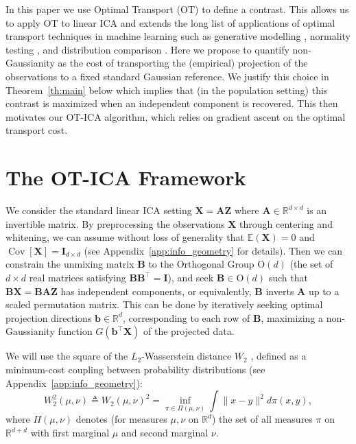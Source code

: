 \documentclass[accepted]{tpm2026} %
\newcommand{\Xb}{\mathbf{X}}
\newcommand{\Ab}{\mathbf{A}}
\newcommand{\Zb}{\mathbf{Z}}
\begin{document}
In this paper we use Optimal Transport (OT) \citep{monge1781, kantorovich1942}
to define a contrast.
This allows us to apply OT to linear ICA and extends the long list of applications of optimal transport techniques in machine learning such as generative modelling \citep{pmlr-v70-arjovsky17a}, normality testing \citep{delbarrio1999}, and
distribution comparison \citep{peyre2019computational}.
Here we propose to quantify non-Gaussianity as the cost of transporting the (empirical) projection of the observations to a fixed standard Gaussian reference.
We justify this choice in 
Theorem~\ref{th:main} below which implies that (in the population setting) this  contrast is maximized when an independent component is recovered. This then motivates our OT-ICA algorithm, which relies on  gradient ascent on the optimal transport cost.


\section{The OT-ICA Framework}\label{sec:OT-framework}

We consider the standard linear ICA setting $\Xb = \Ab\Zb$ where $\Ab\in \mathbb{R}^{d\times d}$ is an invertible matrix. By preprocessing the observations $\Xb$ through centering and whitening, we can assume without loss of generality that $\mathbb{E}(\mathbf{X})=0$ and $\operatorname{Cov}[{\mathbf{X}}] = \mathbf{I}_{d\times d}$ (see Appendix~\ref{app:info_geometry} for details). Then we can constrain the unmixing matrix $\mathbf{B}$ to the Orthogonal Group $\mathrm{O}(d)$ (the set of $d\times d$ real matrices satisfying $\mathbf{B}\mathbf{B}^\top = \mathbf{I}$), and seek $\mathbf{B}\in \mathrm{O}(d)$ such that $\mathbf{B}\Xb=\mathbf{B}\Ab\Zb$ has independent components, or equivalently, $\mathbf{B}$ inverts $\Ab$ up to a scaled permutation matrix. 
This can be done by iteratively seeking optimal projection directions
$\mathbf{b}\in\mathbb{R}^d$, corresponding to each row of
$\mathbf{B}$, maximizing a non-Gaussianity function $G(\mathbf{b}^\top \Xb)$ 
of the projected data. 

We will use the square of the $L_2$-Wasserstein distance $W_2$ \citep{villani2003}, 
defined as a minimum-cost coupling between probability distributions (see Appendix~\ref{app:info_geometry}):
\begin{equation}
    W_2^2(\mu, \nu) \!\triangleq\!W_2(\mu, \nu)^2\!=\!\!\!  \inf_{\pi \in \Pi(\mu, \nu)} \int\!\! \|x - y\|^2  d\pi(x, y) ,
\end{equation}
where $\Pi(\mu,\nu)$ denotes (for measures $\mu,\nu$ on $\mathbb{R}^d$) the set of all measures $\pi$ on $\mathbb{R}^{d+d}$ with first marginal $\mu$ and second marginal $\nu$.
\end{document}
